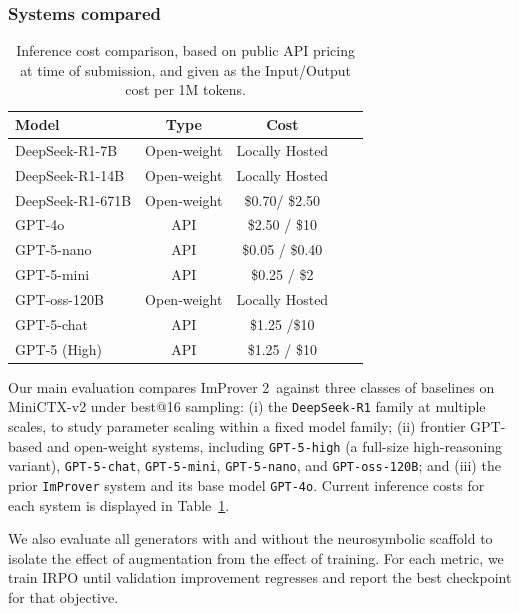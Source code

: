 \subsubsection{Systems compared}


\begin{table}
\centering
\caption{Inference cost comparison, based on public API pricing at 
time of submission, and given as the Input/Output cost per 1M tokens.}
\small
\begin{tabular}{lcccc}
\toprule
\textbf{Model} & \textbf{Type} & \textbf{Cost}\\
\midrule
DeepSeek-R1-7B & Open-weight & Locally Hosted \\
DeepSeek-R1-14B & Open-weight & Locally Hosted \\
DeepSeek-R1-671B & Open-weight & \$0.70/ \$2.50 \\
GPT-4o & API & \$2.50 / \$10 \\
GPT-5-nano & API & \$0.05 / \$0.40 \\
GPT-5-mini & API & \$0.25 / \$2\\
GPT-oss-120B & Open-weight & Locally Hosted \\
GPT-5-chat & API & \$1.25 /\$10   \\
GPT-5 (High) & API & \$1.25 / \$10  \\
\bottomrule
\end{tabular}
\label{tab:cost}
\end{table}

Our main evaluation compares ImProver 2\ against three classes of baselines on MiniCTX-v2 under best@16 sampling: (i) the \texttt{DeepSeek-R1} family at multiple scales, to study parameter scaling within a fixed model family; (ii) frontier GPT-based and open-weight systems, including \texttt{GPT-5-high} (a full-size high-reasoning variant), \texttt{GPT-5-chat}, \texttt{GPT-5-mini}, \texttt{GPT-5-nano}, and \texttt{GPT-oss-120B}; and (iii) the prior \texttt{ImProver} system and its base model \texttt{GPT-4o}. Current inference costs for each system is displayed in Table~\ref{tab:cost}.


We also evaluate all generators with and without the neurosymbolic scaffold to isolate the effect of augmentation from the effect of training.
For each metric, we train IRPO until validation improvement regresses and report the best checkpoint for that objective.


